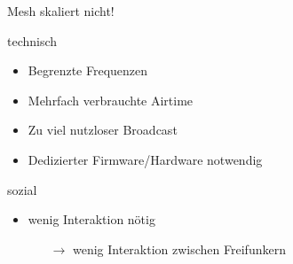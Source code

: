 \documentclass{beamer}
\begin{document}


	\begin{frame}{Mesh skaliert nicht!}
	\begin{block}{technisch}
		\begin{itemize}
			\item Begrenzte Frequenzen
			\item Mehrfach verbrauchte Airtime
			\item Zu viel nutzloser Broadcast
			\item Dedizierter Firmware/Hardware notwendig
		\end{itemize}

	\end{block}
	\begin{block}{sozial}
		\begin{itemize}
			\item wenig Interaktion nötig
			\begin{itemize}
			 \item[$\rightarrow$] wenig Interaktion zwischen Freifunkern
			\end{itemize}

		\end{itemize}
	\end{block}
	\end{frame}
\end{document}
